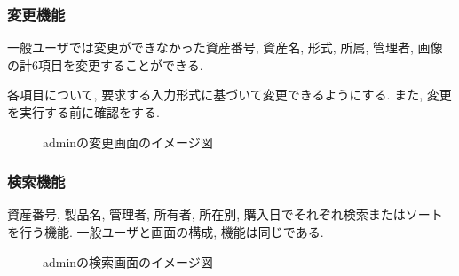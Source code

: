 \documentclass[11ptm]{jsarticle}
\begin{document}
\clearpage
\subsubsection{変更機能}
\label{subsubsec:変更機能}
一般ユーザでは変更ができなかった資産番号, 資産名, 形式, 所属, 管理者, 画像の計6項目を変更することができる. \par
各項目について, 要求する入力形式に基づいて変更できるようにする. また, 変更を実行する前に確認をする. 
\begin{figure}[h]
  \centering
  \caption{\label{fig:adminの変更画面のイメージ図}adminの変更画面のイメージ図}
\end{figure}

\clearpage
\subsubsection{検索機能}
\label{subsubsec:検索機能}
資産番号, 製品名, 管理者, 所有者, 所在別, 購入日でそれぞれ検索またはソートを行う機能. 一般ユーザと画面の構成, 機能は同じである.
\begin{figure}[h]
  \centering
  \caption{\label{fig:adminの検索画面のイメージ図}adminの検索画面のイメージ図}
\end{figure}
\end{document}
